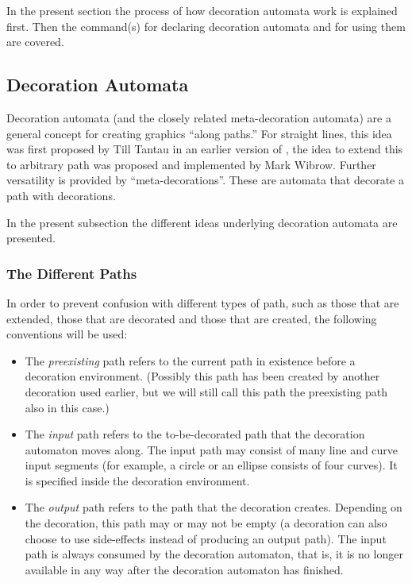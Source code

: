 In the present section the process of how decoration automata work is
explained first. Then the command(s) for declaring decoration automata
and for using them are covered.



\subsection{Decoration Automata}

Decoration automata (and the closely related meta-decoration automata)
are a general concept for creating graphics ``along paths.'' For
straight lines, this idea was first proposed by Till Tantau in an
earlier version of \pgfname, the idea to extend this to arbitrary path
was proposed and implemented by Mark Wibrow. Further versatility is
provided by ``meta-decorations''. These are automata that decorate a
path with decorations.

In the present subsection the different ideas underlying decoration
automata are presented.



\subsubsection{The Different Paths}

In order to prevent confusion with different types of path, such
as those that are extended, those that are decorated and those that
are created, the following conventions will be used:

\begin{itemize}
\item
  The \emph{preexisting} path refers to the current path in existence
  before a decoration environment. (Possibly this path has been
  created by another decoration used earlier, but we will still call
  this path the preexisting path also in this case.)
\item
  The \emph{input} path refers to the to-be-decorated path that the
  decoration automaton moves along. The input path may consist of many
  line and curve input segments (for example, a circle or an ellipse
  consists of four curves). It is specified inside the decoration
  environment.
\item
  The \emph{output} path refers to the path that the decoration
  creates. Depending on the decoration, this path may or may not be
  empty (a decoration can also choose to use side-effects instead of
  producing an output path). The input path is always consumed by the
  decoration automaton, that is, it is no longer available in any way
  after the decoration automaton has finished.
\end{itemize}

